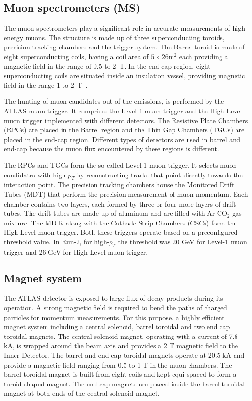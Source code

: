 \subsection{Muon spectrometers (MS)}
The muon spectrometers play a significant role in accurate measurements of high energy muons. The 
structure is made up of three superconducting toroids, 
precision tracking chambers and the trigger system. The Barrel toroid is made of eight superconducting 
coils, having a coil area of $5 \times 26 \text{m}^2$ each 
providing a magnetic field in the range of 0.5 to \qty{2}{\tesla}. In the end-cap region, eight 
superconducting coils are situated inside an insulation vessel, providing magnetic 
field in the range 1 to \qty{2}{\tesla}~\cite{Palestini:2003noa}. 

The hunting of muon candidates out of the emissions, is performed by the ATLAS muon trigger. It 
comprises the Level-1 muon trigger and the High-Level muon trigger implemented with 
different detectors. The Resistive Plate Chambers (RPCs) are placed in the Barrel region and the
Thin Gap Chambers (TGCs) are placed in the end-cap region. Different types of 
detectors are used in barrel and end-cap because the muon flux encountered by these regions is 
different. 

The RPCs and TGCs form the so-called Level-1 muon trigger. It selects muon
candidates with high $p_T$ by reconstructing tracks that point directly towards the interaction point. 
The precision tracking chambers house the Monitored Drift Tubes (MDT) that perform the precision 
measurement of muon momentum. Each chamber contains two layers, each formed by three or four more 
layers of drift tubes. The drift tubes are made up of aluminum and are filled with 
Ar-$\text{CO}_2$ gas mixture.
The MDTs along with the Cathode Strip Chambers (CSCs) form the High-Level muon trigger. Both these triggers operate based on a preconfigured threshold value. In Run-2, for high-$p_T$ the 
threshold was 20 GeV for Level-1 muon trigger and 26 GeV for High-Level muon trigger.  

\subsection{Magnet system}
The ATLAS detector is exposed to large ﬂux of decay products during its operation. A strong magnetic
ﬁeld is required to bend the paths of charged particles for momentum measurements. For this purpose,
a highly eﬃcient magnet system including a central solenoid, barrel toroidal and two end cap toroidal
magnets. The central solenoid magnet, operating with a current of 7.6 kA, is wrapped around the beam
axis and provides a 2 T magnetic ﬁeld to the Inner Detector. The barrel and end cap toroidal magnets
operate at 20.5 kA and provide a magnetic ﬁeld ranging from 0.5 to 1 T in the muon chambers. The
barrel toroidal magnet is built from eight coils and kept equi-spaced to form a toroid-shaped magnet.
The end cap magnets are placed inside the barrel toroidal magnet at both ends of the central solenoid
magnet.


